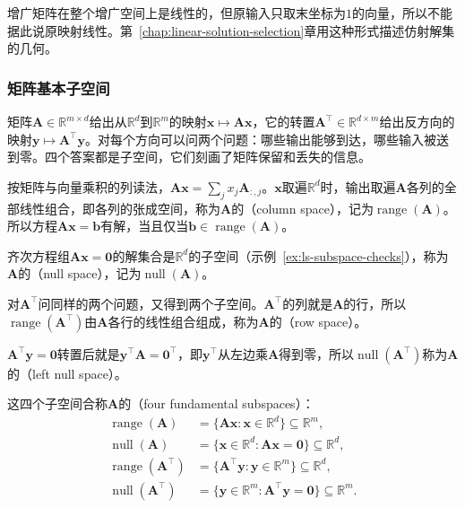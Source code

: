 增广矩阵在整个增广空间上是线性的，但原输入只取末坐标为$1$的向量，所以不能据此说原映射线性。第~\ref{chap:linear-solution-selection}章用这种形式描述仿射解集的几何。

\subsubsection{矩阵基本子空间}
\label{sec:ls-four-fundamental-subspaces}

矩阵$\bm A\in\mathbb R^{m\times d}$给出从$\mathbb R^d$到$\mathbb R^m$的映射$\bm x\mapsto\bm A\bm x$，它的转置$\bm A^\top\in\mathbb R^{d\times m}$给出反方向的映射$\bm y\mapsto\bm A^\top\bm y$。对每个方向可以问两个问题：哪些输出能够到达，哪些输入被送到零。四个答案都是子空间，它们刻画了矩阵保留和丢失的信息。

按矩阵与向量乘积的列读法，$\bm A\bm x=\sum_jx_j\bm A_{:,j}$。$\bm x$取遍$\mathbb R^d$时，输出取遍$\bm A$各列的全部线性组合，即各列的张成空间，称为$\bm A$的（column space），记为$\operatorname{range}(\bm A)$。所以方程$\bm A\bm x=\bm b$有解，当且仅当$\bm b\in\operatorname{range}(\bm A)$。

齐次方程组$\bm A\bm x=\bm0$的解集合是$\mathbb R^d$的子空间（示例~\ref{ex:ls-subspace-checks}），称为$\bm A$的（null space），记为$\operatorname{null}(\bm A)$。

对$\bm A^\top$问同样的两个问题，又得到两个子空间。$\bm A^\top$的列就是$\bm A$的行，所以$\operatorname{range}(\bm A^\top)$由$\bm A$各行的线性组合组成，称为$\bm A$的（row space）。

$\bm A^\top\bm y=\bm0$转置后就是$\bm y^\top\bm A=\bm0^\top$，即$\bm y^\top$从左边乘$\bm A$得到零，所以$\operatorname{null}(\bm A^\top)$称为$\bm A$的（left null space）。

这四个子空间合称$\bm A$的（four fundamental subspaces）：
\begin{equation}
 \begin{aligned}
  \operatorname{range}(\bm A)&=\{\bm A\bm x:\bm x\in\mathbb R^d\}\subseteq\mathbb R^m,\\
  \operatorname{null}(\bm A)&=\{\bm x\in\mathbb R^d:\bm A\bm x=\bm0\}\subseteq\mathbb R^d,\\
  \operatorname{range}(\bm A^\top)&=\{\bm A^\top\bm y:\bm y\in\mathbb R^m\}\subseteq\mathbb R^d,\\
  \operatorname{null}(\bm A^\top)&=\{\bm y\in\mathbb R^m:\bm A^\top\bm y=\bm0\}\subseteq\mathbb R^m.
 \end{aligned}
 \label{eq:ls-four-fundamental-subspaces}
\end{equation}

